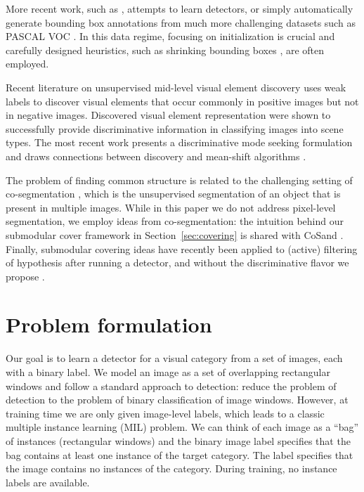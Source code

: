 \documentclass{article}
\begin{document}
More recent work, such as \cite{siva1,siva2012defence}, attempts to learn detectors, or simply automatically generate bounding box annotations from much more challenging datasets such as PASCAL VOC \cite{PASCAL-ijcv}.
In this data regime, focusing on initialization is crucial and carefully designed heuristics, such as shrinking bounding boxes \cite{russakovsky}, are often employed.

Recent literature on unsupervised mid-level visual element discovery \cite{discovery1, discovery2, discovery4, discovery5, discovery6} uses weak labels to discover visual elements that occur commonly in positive images but not in negative images. Discovered visual element representation were shown to successfully provide discriminative information in classifying images into scene types. The most recent work \cite{discovery3} presents a discriminative mode seeking formulation and draws connections between discovery and mean-shift algorithms \cite{meanshift1}.





The problem of finding common structure is related to the challenging setting of co-segmentation \cite{rother06, joulin10, alexe10}, which is the unsupervised segmentation of an object that is present in multiple images. While in this paper we do not address pixel-level segmentation, we employ ideas from co-segmentation: the intuition behind our submodular cover framework in Section~\ref{sec:covering} is shared with CoSand \cite{kim11}. Finally, submodular covering ideas have recently been applied to (active) filtering of hypothesis after running a detector, and without the discriminative flavor we propose \cite{barinova12,chen14}.

















\section{Problem formulation}
Our goal is to learn a detector for a visual category from a set of images, each with a binary label.
We model an image as a set of overlapping rectangular windows and follow a standard approach to detection: reduce the problem of detection to the problem of binary classification of image windows.
However, at training time we are only given image-level labels, which leads to a classic multiple instance learning (MIL) problem.
We can think of each image as a ``bag'' of instances (rectangular windows) and
the binary image label  specifies that the bag contains at least one instance of the target category.
The label  specifies that the image contains no instances of the category.
During training, no instance labels are available.
\end{document}
